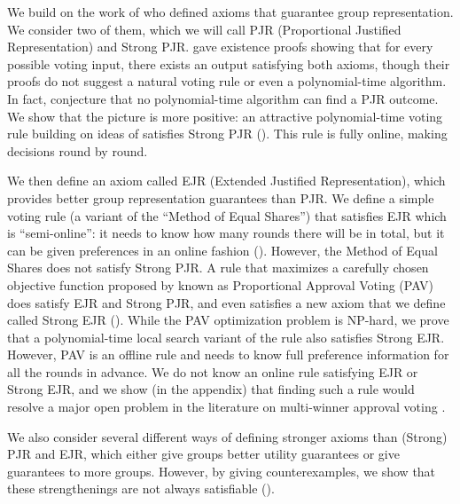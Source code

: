 \documentclass[10pt]{scrartcl}
\theoremstyle{plain}
\theoremstyle{definition}
\begin{document}
We build on the work of \citet{bulteau2021jr} who defined axioms that guarantee group representation. We consider two of them, which we will call PJR (Proportional Justified Representation) and Strong PJR. \citet{bulteau2021jr} gave existence proofs showing that for every possible voting input, there exists an output satisfying both axioms, though their proofs do not suggest a natural voting rule or even a polynomial-time algorithm. In fact, \citet{bulteau2021jr} conjecture that no polynomial-time algorithm can find a PJR outcome. We show that the picture is more positive: an attractive polynomial-time voting rule building on ideas of \citet{Phra94a} satisfies Strong PJR (). This rule is fully online, making decisions round by round.

We then define an axiom called EJR (Extended Justified Representation), which provides better group representation guarantees than PJR. 
We define a simple voting rule (a variant of the ``Method of Equal Shares'') that satisfies EJR which is ``semi-online'': it needs to know how many rounds there will be in total, but it can be given preferences in an online fashion ().  
However, the Method of Equal Shares does not satisfy Strong PJR.
A rule that maximizes a carefully chosen objective function proposed by \citet{Thie95a} known as Proportional Approval Voting (PAV) does satisfy EJR and Strong PJR, and even satisfies a new axiom that we define called Strong EJR (). While the PAV optimization problem is NP-hard, we prove that a polynomial-time local search variant of the rule also satisfies Strong EJR. However, PAV is an offline rule and needs to know full preference information for all the rounds in advance. We do not know an online rule satisfying EJR or Strong EJR, and we show (in the appendix) that finding such a rule would resolve a major open problem in the literature on multi-winner approval voting \citep{lacknerskowron}.

We also consider several different ways of defining stronger axioms than (Strong) PJR and EJR, which either give groups better utility guarantees or give guarantees to more groups. However, by giving counterexamples, we show that these strengthenings are not always satisfiable ().
\end{document}
